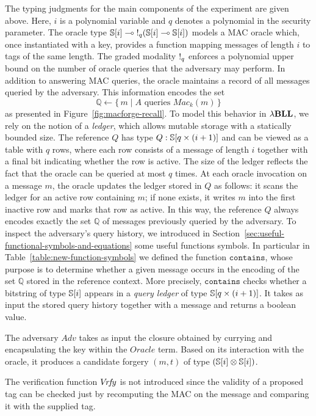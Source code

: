 The typing judgments for the main components of the experiment are given above. Here, $i$ is a polynomial variable and $q$ denotes a polynomial in the security parameter. The oracle type $\mathbb{S}[i] \multimap \mathord{!}_{q}(\mathbb{S}[i] \multimap \mathbb{S}[i])$ models a MAC oracle which,
once instantiated with a key, provides a function mapping messages of length $i$ to tags of the same length. The graded modality $\mathord{!}_{q}$ enforces a polynomial upper bound on the number of oracle queries that the adversary may perform. In addition to answering MAC queries, the oracle maintains a record of all messages queried by the adversary. This information encodes the set
\[
\mathbb{Q} \gets \{\, m \mid A \text{ queries } Mac_k(m) \,\}
\]
as presented in Figure~\ref{fig:macforge-recall}. To model this behavior in ${\lambda}\mathbf{BLL}$, we rely on the notion of a \emph{ledger}, which allows mutable storage with a statically bounded size. The reference $Q$ has type $Q : \mathbb{S}[q \times (i+1)]$ and can be viewed as a table with $q$ rows, where each row consists of a message of length $i$ together with a final bit indicating whether the row is active. The size of the ledger reflects the fact that the oracle can be queried at most $q$ times. At each oracle invocation on a message $m$, the oracle updates the ledger stored in $Q$ as follows: it scans the ledger for an active row containing $m$; if none exists, it writes $m$ into the first inactive row and marks that row as active. In this way, the reference $Q$ always encodes exactly the set $\mathbb{Q}$ of messages previously queried by the adversary. To inspect the adversary's query history, we introduced in Section~\ref{sec:useful-functional-symbols-and-equations} some useful functions symbols. In particular in Table~\ref{table:new-function-symbols} we defined the function $\mathtt{contains}$, whose purpose is to determine whether a given message occurs in the encoding of the set $\mathbb{Q}$ stored in the reference context. More precisely, $\mathtt{contains}$ checks whether a bitstring of type $\mathbb{S}[i]$ appears in a \textit{query ledger} of type $\mathbb{S}[q\times(i+1)]$. It takes as input the stored query history together with a message and returns a boolean value.

The adversary $Adv$ takes as input the closure obtained by currying and encapsulating the key within the $Oracle$ term. Based on its interaction with the oracle, it produces a candidate forgery $(m,t)$ of type $(\mathbb{S}[i] \otimes \mathbb{S}[i])$. 

The verification function $V\!r\!f\!y$ is not introduced since the validity of a proposed tag can be checked just by recomputing the MAC on the message and comparing it with the supplied tag.

